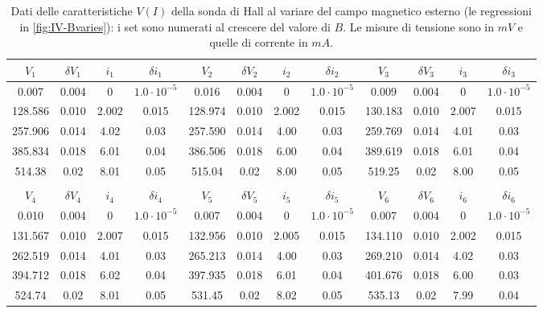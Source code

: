 \begin{table}
\centering \tiny
\begin{tabular}{cccccccccccc}
$V_1$ & $\delta V_1$ & $i_1$ & $\delta i_1$ & $V_2$ & $\delta V_2$ & $i_2$ & $\delta i_2$ & $V_3$ & $\delta V_3$ & $i_3$ & $\delta i_3$ \\
\hline
0.007 & 0.004 & 0 & $1.0 \cdot 10^{-5}$ & 0.016 & 0.004 & 0 & $1.0 \cdot 10^{-5}$ & 0.009 & 0.004 & 0 & $1.0 \cdot 10^{-5}$\\
128.586 & 0.010 & 2.002 & 0.015 & 128.974 & 0.010 & 2.002 & 0.015 & 130.183 & 0.010 & 2.007 & 0.015\\
257.906 & 0.014 & 4.02 & 0.03 & 257.590 & 0.014 & 4.00 & 0.03 & 259.769 & 0.014 & 4.01 & 0.03\\
385.834 & 0.018 & 6.01 & 0.04 & 386.506 & 0.018 & 6.00 & 0.04 & 389.619 & 0.018 & 6.01 & 0.04\\
514.38 & 0.02 & 8.01 & 0.05 & 515.04 & 0.02 & 8.00 & 0.05 & 519.25 & 0.02 & 8.00 & 0.05\\
\\
$V_4$ & $\delta V_4$ & $i_4$ & $\delta i_4$ & $V_5$ & $\delta V_5$ & $i_5$ & $\delta i_5$ & $V_6$ & $\delta V_6$ & $i_6$ & $\delta i_6$ \\
\hline
0.010 & 0.004 & 0 & $1.0 \cdot 10^{-5}$ & 0.007 & 0.004 & 0 & $1.0 \cdot 10^{-5}$ & 0.007 & 0.004 & 0 & $1.0 \cdot 10^{-5}$\\
131.567 & 0.010 & 2.007 & 0.015 & 132.956 & 0.010 & 2.005 & 0.015 & 134.110 & 0.010 & 2.002 & 0.015\\
262.519 & 0.014 & 4.01 & 0.03 & 265.213 & 0.014 & 4.00 & 0.03 & 269.210 & 0.014 & 4.02 & 0.03\\
394.712 & 0.018 & 6.02 & 0.04 & 397.935 & 0.018 & 6.01 & 0.04 & 401.676 & 0.018 & 6.00 & 0.03\\
524.74 & 0.02 & 8.01 & 0.05 & 531.45 & 0.02 & 8.02 & 0.05 & 535.13 & 0.02 & 7.99 & 0.04\\
\end{tabular}
\caption{Dati delle caratteristiche $ V(I) $ della sonda di Hall al variare del campo magnetico esterno (le regressioni in \cref{fig:IV-Bvaries}): i set sono numerati al crescere del valore di $ B $. Le misure di tensione sono in $ \unit{mV} $ e quelle di corrente in $ \unit{mA} $.}
\label{tab:IVmagnetoresistance}
\end{table}

